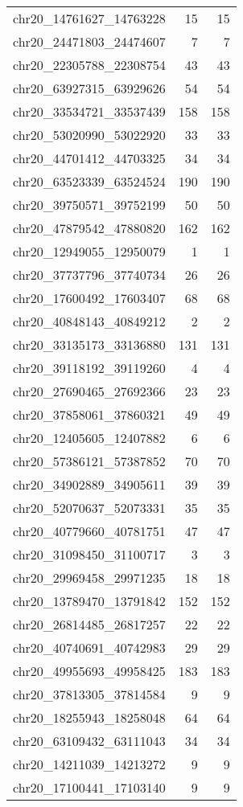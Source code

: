 \begin{longtable}{lrr}
chr20_14761627_14763228 & 15 & 15 \\
chr20_24471803_24474607 & 7 & 7 \\
chr20_22305788_22308754 & 43 & 43 \\
chr20_63927315_63929626 & 54 & 54 \\
chr20_33534721_33537439 & 158 & 158 \\
chr20_53020990_53022920 & 33 & 33 \\
chr20_44701412_44703325 & 34 & 34 \\
chr20_63523339_63524524 & 190 & 190 \\
chr20_39750571_39752199 & 50 & 50 \\
chr20_47879542_47880820 & 162 & 162 \\
chr20_12949055_12950079 & 1 & 1 \\
chr20_37737796_37740734 & 26 & 26 \\
chr20_17600492_17603407 & 68 & 68 \\
chr20_40848143_40849212 & 2 & 2 \\
chr20_33135173_33136880 & 131 & 131 \\
chr20_39118192_39119260 & 4 & 4 \\
chr20_27690465_27692366 & 23 & 23 \\
chr20_37858061_37860321 & 49 & 49 \\
chr20_12405605_12407882 & 6 & 6 \\
chr20_57386121_57387852 & 70 & 70 \\
chr20_34902889_34905611 & 39 & 39 \\
chr20_52070637_52073331 & 35 & 35 \\
chr20_40779660_40781751 & 47 & 47 \\
chr20_31098450_31100717 & 3 & 3 \\
chr20_29969458_29971235 & 18 & 18 \\
chr20_13789470_13791842 & 152 & 152 \\
chr20_26814485_26817257 & 22 & 22 \\
chr20_40740691_40742983 & 29 & 29 \\
chr20_49955693_49958425 & 183 & 183 \\
chr20_37813305_37814584 & 9 & 9 \\
chr20_18255943_18258048 & 64 & 64 \\
chr20_63109432_63111043 & 34 & 34 \\
chr20_14211039_14213272 & 9 & 9 \\
chr20_17100441_17103140 & 9 & 9 \\

\end{longtable}
